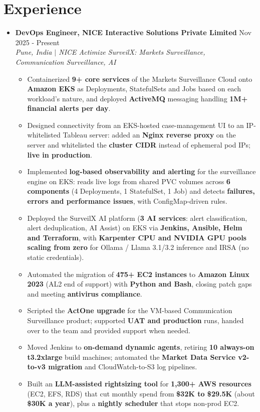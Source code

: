 \documentclass[letterpaper,11pt]{article}
\newcommand{\resumeItem}[1]{
  \item\small{#1}
}
\newcommand{\resumeSubheading}[4]{
  \item
  \textbf{#1} \hfill #2 \\
  \textit{\small #3} \hfill \textit{\small #4}
  \vspace{-5pt}
}
\newcommand{\resumeItemListStart}{
  \begin{itemize}[
    leftmargin=0.22in,
    label=\raisebox{0.25ex}{\scriptsize$\bullet$},
    itemsep=0.5pt,
    topsep=1pt,
    parsep=0pt
  ]
}
\newcommand{\resumeItemListEnd}{
  \end{itemize}\vspace{-2pt}
}
\begin{document}
\section{Experience}
\begin{itemize}[leftmargin=0.15in, label={}]

\resumeSubheading
    {DevOps Engineer, NICE Interactive Solutions Private Limited}{Nov 2025 - Present}
    {Pune, India $|$ NICE Actimize SurveilX: Markets Surveillance, Communication Surveillance, AI}{}
\resumeItemListStart
    \resumeItem{Containerized \textbf{9+ core services} of the Markets Surveillance Cloud onto \textbf{Amazon EKS} as Deployments, StatefulSets and Jobs based on each workload's nature, and deployed \textbf{ActiveMQ} messaging handling \textbf{1M+ financial alerts per day}.}
    \resumeItem{Designed connectivity from an EKS-hosted case-management UI to an IP-whitelisted Tableau server: added an \textbf{Nginx reverse proxy} on the server and whitelisted the \textbf{cluster CIDR} instead of ephemeral pod IPs; \textbf{live in production}.}
    \resumeItem{Implemented \textbf{log-based observability and alerting} for the surveillance engine on EKS: reads live logs from shared PVC volumes across \textbf{6 components} (4 Deployments, 1 StatefulSet, 1 Job) and detects \textbf{failures, errors and performance issues}, with ConfigMap-driven rules.}
    \resumeItem{Deployed the SurveilX AI platform (\textbf{3 AI services}: alert classification, alert deduplication, AI Assist) on EKS via \textbf{Jenkins, Ansible, Helm and Terraform}, with \textbf{Karpenter CPU and NVIDIA GPU pools scaling from zero} for Ollama / Llama 3.1/3.2 inference and IRSA (no static credentials).}
    \resumeItem{Automated the migration of \textbf{475+ EC2 instances} to \textbf{Amazon Linux 2023} (AL2 end of support) with \textbf{Python and Bash}, closing patch gaps and meeting \textbf{antivirus compliance}.}
    \resumeItem{Scripted the \textbf{ActOne upgrade} for the VM-based Communication Surveillance product; supported \textbf{UAT and production} runs, handed over to the team and provided support when needed.}
    \resumeItem{Moved Jenkins to \textbf{on-demand dynamic agents}, retiring \textbf{10 always-on t3.2xlarge} build machines; automated the \textbf{Market Data Service v2-to-v3 migration} and CloudWatch-to-S3 log pipelines.}
    \resumeItem{Built an \textbf{LLM-assisted rightsizing tool} for \textbf{1,300+ AWS resources} (EC2, EFS, RDS) that cut monthly spend from \textbf{\$32K to \$29.5K} (about \textbf{\$30K a year}), plus a \textbf{nightly scheduler} that stops non-prod EC2.}
\resumeItemListEnd


\end{itemize}
\end{document}
